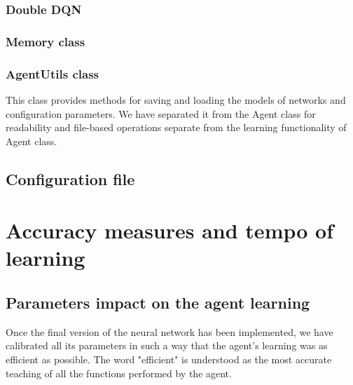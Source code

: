 \documentclass{article}
\begin{document}
\subsubsection{Double DQN}


\subsubsection{Memory class}

\subsubsection{AgentUtils class}
This class provides methods for saving and loading the models of networks and configuration parameters. We have separated it from the Agent class for readability and file-based operations separate from the learning functionality of Agent class.

\subsection{Configuration file}

\section{Accuracy measures and tempo of learning}

\subsection{Parameters impact on the agent learning}
Once the final version of the neural network has been implemented,
we have calibrated all its parameters in such a way that the agent's learning was as efficient as possible.
The word "efficient" is understood as the most accurate teaching of all the functions performed by the agent.
\end{document}
